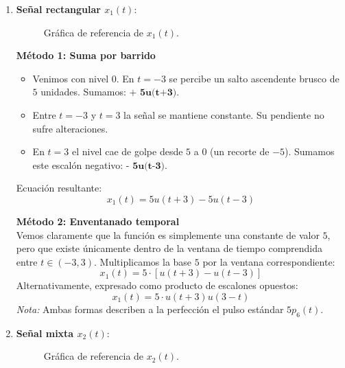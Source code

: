 \documentclass[10pt,a4paper]{article}
\begin{document}
	\begin{enumerate}[label=\textbf{\alph*)}]
		\item \textbf{Señal rectangular $x_1(t)$}:
		
		\begin{figure}[H]
			\centering
			
			\caption{Gráfica de referencia de $x_1(t)$.}
		\end{figure}

		\textbf{Método 1: Suma por barrido}
		\begin{itemize}
		    \item Venimos con nivel $0$. En $t=-3$ se percibe un salto ascendente brusco de $5$ unidades. Sumamos: $\textbf{+ 5u(t+3)}$.
		    \item Entre $t=-3$ y $t=3$ la señal se mantiene constante. Su pendiente no sufre alteraciones.
		    \item En $t=3$ el nivel cae de golpe desde $5$ a $0$ (un recorte de $-5$). Sumamos este escalón negativo: $\textbf{- 5u(t-3)}$.
		\end{itemize}
		Ecuación resultante:
		\[ x_1(t) = 5u(t+3) - 5u(t-3) \]
        
        \textbf{Método 2: Enventanado temporal} \\
        Vemos claramente que la función es simplemente una constante de valor $5$, pero que existe únicamente dentro de la ventana de tiempo comprendida entre $t \in (-3, 3)$. Multiplicamos la base $5$ por la ventana correspondiente:
        \[ x_1(t) = 5 \cdot [u(t+3) - u(t-3)] \]
        Alternativamente, expresado como producto de escalones opuestos:
        \[ x_1(t) = 5 \cdot u(t+3)u(3-t) \]
        \textit{Nota:} Ambas formas describen a la perfección el pulso estándar $5 p_6(t)$.

		\item \textbf{Señal mixta $x_2(t)$}:
		
		\begin{figure}[H]
			\centering
			
			\caption{Gráfica de referencia de $x_2(t)$.}
			\label{fig:ejer2b_orig}
		\end{figure}


\end{enumerate}
\end{document}
